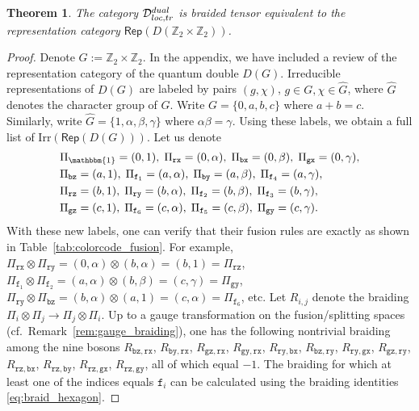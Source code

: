 \documentclass[10pt,a4paper]{amsart}
\newtheorem{theorem}{Theorem}[section]
\theoremstyle{definition}
\theoremstyle{remark}
\theoremstyle{remark}
\newcommand\Rep {\mathsf{Rep}}
\newcommand\Irr {\mathrm{Irr}}
\newcommand{\one}{\mathbbm{1}}
\begin{document}
\setcounter{section}{3}
\setcounter{equation}{7}
\setcounter{example}{0}
\setcounter{notation}{0}
\setcounter{remark}{5}
\setcounter{theorem}{21}
\begin{theorem}\label{thm:category_equivalence}
    The category $\mathcal D_{\rm loc,tr}^{\rm dual}$ is braided tensor equivalent to the representation category $\Rep(D(\mathbb{Z}_2\times \mathbb{Z}_2))$.
\end{theorem}

\setcounter{section}{3}
\setcounter{equation}{7}
\setcounter{example}{0}
\setcounter{notation}{0}
\setcounter{remark}{5}
\setcounter{theorem}{22}
\begin{proof}
    Denote $G := \mathbb{Z}_2\times \mathbb{Z}_2$. In the appendix, we have included a review of the representation category of the quantum double $D(G)$. Irreducible representations of $D(G)$ are labeled by pairs $(g,\chi)$, $g\in G, \chi\in\widehat{G}$, where $\widehat{G}$ denotes the character group of $G$. 
    Write $G = \{0,a,b,c\}$ where $a+b=c$. Similarly, write $\widehat{G} = \{1,\alpha,\beta,\gamma\}$ where $\alpha\beta=\gamma$. 
    Using these labels, we obtain a full list of $\Irr(\Rep(D(G)))$. Let us denote 
    \begin{align*}
    	& \Pi_\one = (0,1),\; \Pi_{\mathtt{rx}} = (0,\alpha),\; \Pi_{\mathtt{bx}} = (0,\beta),\; \Pi_{\mathtt{gx}} = (0,\gamma), \\
    	& \Pi_{\mathtt{bz}} = (a,1),\; \Pi_{\mathtt{f}_1} = (a,\alpha),\; \Pi_{\mathtt{by}} = (a,\beta),\; \Pi_{\mathtt{f}_4} = (a,\gamma), \\
    	& \Pi_{\mathtt{rz}} = (b,1),\; \Pi_{\mathtt{ry}} = (b,\alpha),\; \Pi_{\mathtt{f}_2} = (b,\beta),\; \Pi_{\mathtt{f}_3} = (b,\gamma), \\
    	& \Pi_{\mathtt{gz}} = (c,1),\; \Pi_{\mathtt{f}_6} = (c,\alpha),\; \Pi_{\mathtt{f}_5} = (c,\beta),\; \Pi_{\mathtt{gy}} = (c,\gamma). 
    \end{align*}
    With these new labels, one can verify that their fusion rules are exactly as shown in Table~\ref{tab:colorcode_fusion}. 
    For example, $\Pi_{\mathtt{rx}}\otimes\Pi_{\mathtt{ry}} = (0,\alpha)\otimes(b,\alpha) = (b,1) = \Pi_{\mathtt{rz}}$, $\Pi_{\mathtt{f}_1}\otimes \Pi_{\mathtt{f}_2} = (a,\alpha)\otimes (b,\beta)  = (c,\gamma) = \Pi_{\mathtt{gy}}$, $\Pi_{\mathtt{ry}}\otimes \Pi_{\mathtt{bz}} = (b,\alpha)\otimes (a,1) = (c,\alpha) = \Pi_{\mathtt{f}_6}$, etc. 
    Let $R_{i,j}$ denote the braiding $\Pi_i\otimes \Pi_j\to \Pi_j\otimes \Pi_i$. Up to a gauge transformation on the fusion/splitting spaces (cf.~Remark~\ref{rem:gauge_braiding}), one has the following nontrivial braiding among the nine bosons $R_{\mathtt{bz},\mathtt{rx}}$, $R_{\mathtt{by},\mathtt{rx}}$, $R_{\mathtt{gz},\mathtt{rx}}$, $ R_{\mathtt{gy},\mathtt{rx}}$, $R_{\mathtt{ry},\mathtt{bx}}$, $R_{\mathtt{bz},\mathtt{ry}}$, $R_{\mathtt{ry},\mathtt{gx}}$, $R_{\mathtt{gz},\mathtt{ry}}$, $R_{\mathtt{rz},\mathtt{bx}}$, $R_{\mathtt{rz},\mathtt{by}}$, $R_{\mathtt{rz},\mathtt{gx}}$, $R_{\mathtt{rz},\mathtt{gy}}$, all of which equal $-1$. 
    The braiding for which at least one of the indices equals $\mathtt{f}_i$ can be calculated using the braiding identities \eqref{eq:braid_hexagon}.


\end{proof}
\end{document}
